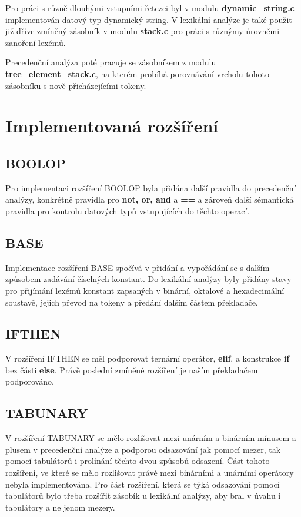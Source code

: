 \documentclass[12pt]{article}
\begin{document}
Pro práci s různě dlouhými vstupními řetezci byl v modulu \textbf{dynamic\_string.c} implementován datový typ dynamický string. V lexikální analýze je také použit již dříve zmíněný zásobník v modulu \textbf{stack.c} pro práci s různýmy úrovněmi zanoření lexémů.


Precedenční analýza poté pracuje se zásobníkem z modulu \textbf{tree\_element\_stack.c}, na kterém pro\-bí\-há porovnávání vrcholu tohoto zásobníku s nově přicházejícími tokeny.

\section{Implementovaná rozšíření}
\subsection{BOOLOP}
Pro implementaci rozšíření BOOLOP byla přidána další pravidla do precedenční analýzy, konkrétně pravidla pro \textbf{not, or, and} a \textbf{==} a zároveň další sémantická pravidla pro kontrolu datových typů vstupujících do těchto operací.

\subsection{BASE}
Implementace rozšíření BASE spočívá v přidání a vypořádání se s dalším způsobem zadávání čí\-sel\-ných konstant. Do lexikální analýzy byly přidány stavy pro přijímání lexémů konstant zapsaných v binární, oktalové a hexadecimální soustavě, jejich převod na tokeny a předání dalším částem pře\-kla\-da\-če.

\subsection{IFTHEN}
V rozšíření IFTHEN se měl podporovat ternární operátor, \textbf{elif}, a konstrukce \textbf{if} bez části \textbf{else}. Právě poslední zmíněné rozšíření je naším překladačem podporováno.

\subsection{TABUNARY}
V rozšíření TABUNARY se mělo rozlišovat mezi unárním a bi\-nár\-ním mínusem a plusem v precedenční analýze a podporou odsazování jak pomocí mezer, tak pomocí tabulátorů i prolínání těchto dvou způsobů odsazení. Část tohoto rozšíření, ve které se mělo rozlišovat právě mezi binárními a unárními operátory nebyla implementována. Pro část rozšíření, která se týká odsazování pomocí tabulátorů bylo třeba rozšířit zásobík u lexikální analýzy, aby bral v úvahu i tabulátory a ne jenom mezery.
\end{document}
